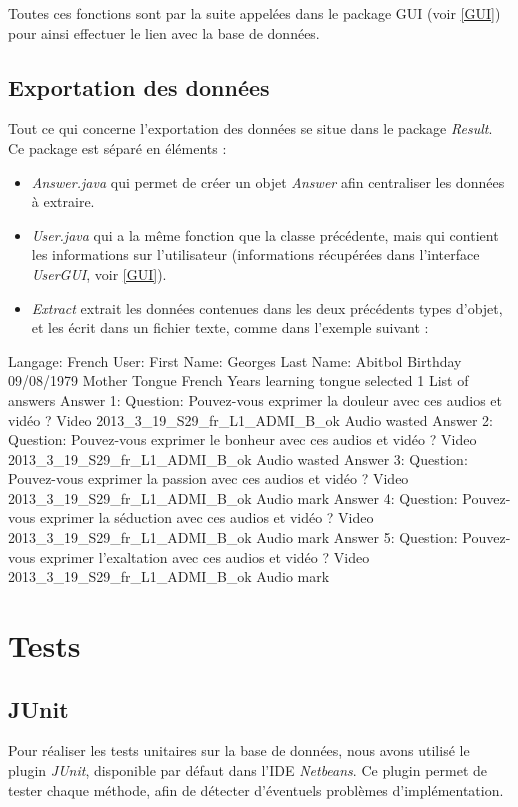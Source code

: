 Toutes ces fonctions sont par la suite appelées dans le package GUI (voir \ref{GUI}) pour ainsi effectuer le lien avec la base de données.

\subsection{Exportation des données}\label{export}

Tout ce qui concerne l'exportation des données se situe dans le package \textit{Result}. Ce package est séparé en 
 éléments :
 
 \begin{itemize}
  \item \textit{Answer.java} qui permet de créer un objet \textit{Answer} afin centraliser les données à extraire.
  \item \textit{User.java} qui a la même fonction que la classe précédente, mais qui contient les informations sur l'utilisateur (informations récupérées dans l'interface \textit{UserGUI}, voir \ref{GUI}).
  \item \textit{Extract} extrait les données contenues dans les deux précédents types d'objet, et les écrit dans un fichier texte, comme dans l'exemple suivant :
 \end{itemize}
 
 \begin{verbatimtab}
  Langage:   French
  User:
      First Name:   Georges
      Last Name:   Abitbol
      Birthday   09/08/1979
      Mother Tongue   French
      Years learning tongue selected   1
  List of answers
      Answer 1:
	    Question:   Pouvez-vous exprimer la douleur avec ces audios et vidéo ?
	    Video   2013_3_19_S29_fr_L1_ADMI_B_ok
	    Audio   wasted
      Answer 2:
	    Question:   Pouvez-vous exprimer le bonheur avec ces audios et vidéo ?
	    Video   2013_3_19_S29_fr_L1_ADMI_B_ok
	    Audio   wasted
      Answer 3:
	    Question:   Pouvez-vous exprimer la passion avec ces audios et vidéo ?
	    Video   2013_3_19_S29_fr_L1_ADMI_B_ok
	    Audio   mark
      Answer 4:
	    Question:   Pouvez-vous exprimer la séduction avec ces audios et vidéo ?
	    Video   2013_3_19_S29_fr_L1_ADMI_B_ok
	    Audio   mark
      Answer 5:
	    Question:   Pouvez-vous exprimer l'exaltation avec ces audios et vidéo ?
	    Video   2013_3_19_S29_fr_L1_ADMI_B_ok
	    Audio   mark

 \end{verbatimtab}



\section{Tests}\label{tests}

\subsection{JUnit}

Pour réaliser les tests unitaires sur la base de données, nous avons utilisé le plugin \textit{JUnit}, disponible par défaut dans l'IDE \textit{Netbeans}.
Ce plugin permet de tester chaque méthode, afin de détecter d'éventuels problèmes d'implémentation.
